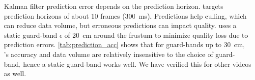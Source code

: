 %
Kalman filter prediction error depends on the prediction horizon.
%
\livo targets prediction horizons of about 10 frames (300~ms).
%
Predictions help culling, which can reduce data volume, but erroneous predictions can impact quality.
%
\livo uses a static guard-band $\epsilon$ of 20~cm around the frustum to minimize quality loss due to prediction errors.
%
\cref{tab:prediction_acc} shows that for guard-bands up to 30~cm, \livo's accuracy and data volume are relatively insensitive to the choice of guard-band, hence a static guard-band works well.
%
We have verified this for other videos as well.


